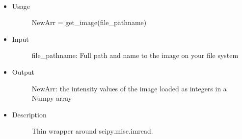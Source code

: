 \documentclass[letterpaper,10pt,oneside]{sphinxmanual}
\begin{document}

\begin{fulllineitems}
\label{index:libcelegans.get_image}~\begin{itemize}
\item {} \begin{description}
\item[{Usage }] \leavevmode
NewArr = get\_image(file\_pathname)

\end{description}

\item {} \begin{description}
\item[{Input}] \leavevmode
file\_pathname: Full path and name to the image on your file system

\end{description}

\item {} \begin{description}
\item[{Output}] \leavevmode
NewArr: the intensity values of the image loaded as integers in a Numpy array

\end{description}

\item {} \begin{description}
\item[{Description}] \leavevmode
Thin wrapper around scipy.misc.imread.

\end{description}

\end{itemize}

\end{fulllineitems}

\end{document}
